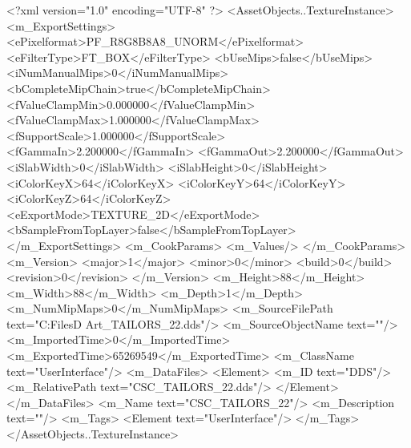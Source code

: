 <?xml version="1.0" encoding="UTF-8" ?>
<AssetObjects..TextureInstance>
	<m_ExportSettings>
		<ePixelformat>PF_R8G8B8A8_UNORM</ePixelformat>
		<eFilterType>FT_BOX</eFilterType>
		<bUseMips>false</bUseMips>
		<iNumManualMips>0</iNumManualMips>
		<bCompleteMipChain>true</bCompleteMipChain>
		<fValueClampMin>0.000000</fValueClampMin>
		<fValueClampMax>1.000000</fValueClampMax>
		<fSupportScale>1.000000</fSupportScale>
		<fGammaIn>2.200000</fGammaIn>
		<fGammaOut>2.200000</fGammaOut>
		<iSlabWidth>0</iSlabWidth>
		<iSlabHeight>0</iSlabHeight>
		<iColorKeyX>64</iColorKeyX>
		<iColorKeyY>64</iColorKeyY>
		<iColorKeyZ>64</iColorKeyZ>
		<eExportMode>TEXTURE_2D</eExportMode>
		<bSampleFromTopLayer>false</bSampleFromTopLayer>
	</m_ExportSettings>
	<m_CookParams>
		<m_Values/>
	</m_CookParams>
	<m_Version>
		<major>1</major>
		<minor>0</minor>
		<build>0</build>
		<revision>0</revision>
	</m_Version>
	<m_Height>88</m_Height>
	<m_Width>88</m_Width>
	<m_Depth>1</m_Depth>
	<m_NumMipMaps>0</m_NumMipMaps>
	<m_SourceFilePath text="C:\Users\Shadow\Desktop\Working Files\2D Art\Quarters\Tailors\CSC_TAILORS_22.dds"/>
	<m_SourceObjectName text=""/>
	<m_ImportedTime>0</m_ImportedTime>
	<m_ExportedTime>65269549</m_ExportedTime>
	<m_ClassName text="UserInterface"/>
	<m_DataFiles>
		<Element>
			<m_ID text="DDS"/>
			<m_RelativePath text="CSC_TAILORS_22.dds"/>
		</Element>
	</m_DataFiles>
	<m_Name text="CSC_TAILORS_22"/>
	<m_Description text=""/>
	<m_Tags>
		<Element text="UserInterface"/>
	</m_Tags>
</AssetObjects..TextureInstance>

